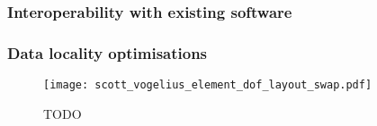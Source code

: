 \documentclass[thesis]{subfiles}
\begin{document}
\subsubsection{Interoperability with existing software}





\subsubsection{Data locality optimisations}
\label{sec:intro_mesh_numbering}




\begin{figure}
  \centering
  \texttt{[image: scott\_vogelius\_element\_dof\_layout\_swap.pdf]}
  \caption{
    TODO
  }
  \label{fig:scott_vogelius_element_dof_layout_swap}
\end{figure}




\end{document}
